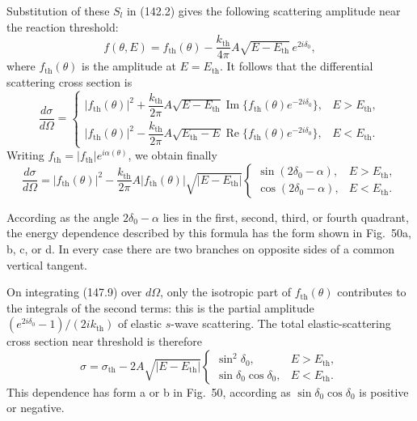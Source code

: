 Substitution of these $S_l$ in (142.2) gives the following scattering amplitude near the reaction threshold:
\begin{equation}
 f(\theta,E)=f_{\mathrm{th}}(\theta)-\frac{k_{\mathrm{th}}}{4\pi}A
 \sqrt{E-E_{\mathrm{th}}}\,e^{2i\delta_0},
 \tag{147.8}
\end{equation}
where $f_{\mathrm{th}}(\theta)$ is the amplitude at $E=E_{\mathrm{th}}$. It follows that the differential scattering cross section is
\[
 \frac{d\sigma}{d\Omega}=
 \begin{cases}
 |f_{\mathrm{th}}(\theta)|^2+\dfrac{k_{\mathrm{th}}}{2\pi}A\sqrt{E-E_{\mathrm{th}}}
 \operatorname{Im}\{f_{\mathrm{th}}(\theta)e^{-2i\delta_0}\},&E>E_{\mathrm{th}},\\
 |f_{\mathrm{th}}(\theta)|^2-\dfrac{k_{\mathrm{th}}}{2\pi}A\sqrt{E_{\mathrm{th}}-E}
 \operatorname{Re}\{f_{\mathrm{th}}(\theta)e^{-2i\delta_0}\},&E<E_{\mathrm{th}}.
 \end{cases}
\]
Writing $f_{\mathrm{th}}=|f_{\mathrm{th}}|e^{i\alpha(\theta)}$, we obtain finally
\begin{equation}
 \frac{d\sigma}{d\Omega}=|f_{\mathrm{th}}(\theta)|^2-
 \frac{k_{\mathrm{th}}}{2\pi}A|f_{\mathrm{th}}(\theta)|\sqrt{|E-E_{\mathrm{th}}|}
 \begin{cases}
 \sin(2\delta_0-\alpha),&E>E_{\mathrm{th}},\\
 \cos(2\delta_0-\alpha),&E<E_{\mathrm{th}}.
 \end{cases}
 \tag{147.9}
\end{equation}

According as the angle $2\delta_0-\alpha$ lies in the first, second, third, or fourth quadrant, the energy dependence described by this formula has the form shown in Fig.~50a, b, c, or d. In every case there are two branches on opposite sides of a common vertical tangent.

On integrating (147.9) over $d\Omega$, only the isotropic part of $f_{\mathrm{th}}(\theta)$ contributes to the integrals of the second terms: this is the partial amplitude $(e^{2i\delta_0}-1)/(2ik_{\mathrm{th}})$ of elastic $s$-wave scattering. The total elastic-scattering cross section near threshold is therefore
\begin{equation}
 \sigma=\sigma_{\mathrm{th}}-2A\sqrt{|E-E_{\mathrm{th}}|}
 \begin{cases}
 \sin^2\delta_0,&E>E_{\mathrm{th}},\\
 \sin\delta_0\cos\delta_0,&E<E_{\mathrm{th}}.
 \end{cases}
 \tag{147.10}
\end{equation}
This dependence has form a or b in Fig.~50, according as $\sin\delta_0\cos\delta_0$ is positive or negative.

